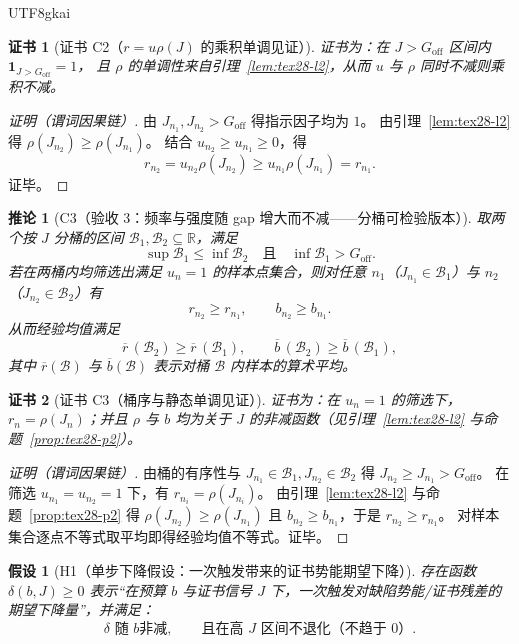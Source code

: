 \documentclass[12pt]{article}
\newtheorem{assumption}{假设}[section]
\newtheorem{corollary}{推论}[section]
\newtheorem{Certificate}{证书}[section]
\newcommand{\RR}{\mathbb{R}}
\newcommand{\indicator}[1]{\mathbf{1}_{#1}}
\begin{document}
\begin{CJK*}{UTF8}{gkai}
\begin{Certificate}[证书 C2（$r=u\rho(J)$ 的乘积单调见证）]
\label{cert:tex28-c2}
证书为：在 $J>G_{\mathrm{off}}$ 区间内 $\indicator{J>G_{\mathrm{off}}}=1$，
且 $\rho$ 的单调性来自引理~\ref{lem:tex28-l2}，从而 $u$ 与 $\rho$ 同时不减则乘积不减。
\end{Certificate}

\begin{proof}[证明（谓词因果链）]
由 $J_{n_1},J_{n_2}>G_{\mathrm{off}}$ 得指示因子均为 $1$。
由引理~\ref{lem:tex28-l2} 得 $\rho(J_{n_2})\ge \rho(J_{n_1})$。
结合 $u_{n_2}\ge u_{n_1}\ge 0$，得
\[
  r_{n_2}=u_{n_2}\rho(J_{n_2})
  \ge u_{n_1}\rho(J_{n_1})=r_{n_1}.
\]
证毕。
\end{proof}

\begin{corollary}[C3（验收 3：频率与强度随 gap 增大而不减——分桶可检验版本）]
\label{cor:tex28-c3}
取两个按 $J$ 分桶的区间 $\mathcal{B}_1,\mathcal{B}_2\subseteq\RR$，满足
\[
  \sup\mathcal{B}_1 \le \inf\mathcal{B}_2
  \quad\text{且}\quad
  \inf\mathcal{B}_1>G_{\mathrm{off}}.
\]
若在两桶内均筛选出满足 $u_n=1$ 的样本点集合，则对任意
$n_1$（$J_{n_1}\in\mathcal{B}_1$）与 $n_2$（$J_{n_2}\in\mathcal{B}_2$）有
\[
  r_{n_2}\ge r_{n_1},\qquad b_{n_2}\ge b_{n_1}.
\]
从而经验均值满足
\[
  \overline{r}\,(\mathcal{B}_2)\ge \overline{r}\,(\mathcal{B}_1),
  \qquad
  \overline{b}\,(\mathcal{B}_2)\ge \overline{b}\,(\mathcal{B}_1),
\]
其中 $\overline{r}(\mathcal{B})$ 与 $\overline{b}(\mathcal{B})$ 表示对桶 $\mathcal{B}$ 内样本的算术平均。
\end{corollary}

\begin{Certificate}[证书 C3（桶序与静态单调见证）]
\label{cert:tex28-c3}
证书为：在 $u_n=1$ 的筛选下，$r_n=\rho(J_n)$；并且 $\rho$ 与 $b$ 均为关于 $J$ 的非减函数（见引理~\ref{lem:tex28-l2} 与命题~\ref{prop:tex28-p2}）。
\end{Certificate}

\begin{proof}[证明（谓词因果链）]
由桶的有序性与 $J_{n_1}\in\mathcal{B}_1,J_{n_2}\in\mathcal{B}_2$ 得 $J_{n_2}\ge J_{n_1}>G_{\mathrm{off}}$。
在筛选 $u_{n_1}=u_{n_2}=1$ 下，有 $r_{n_i}=\rho(J_{n_i})$。
由引理~\ref{lem:tex28-l2} 与命题~\ref{prop:tex28-p2} 得 $\rho(J_{n_2})\ge \rho(J_{n_1})$ 且 $b_{n_2}\ge b_{n_1}$，于是 $r_{n_2}\ge
  r_{n_1}$。
对样本集合逐点不等式取平均即得经验均值不等式。证毕。
\end{proof}

\begin{assumption}[H1（单步下降假设：一次触发带来的证书势能期望下降）]
\label{assu:tex28-h1}
存在函数 $\delta(b,J)\ge 0$ 表示“在预算 $b$ 与证书信号 $J$ 下，一次触发对缺陷势能/证书残差的期望下降量”，并满足：
\[
  \delta \text{ 随 } b \text{非减},\qquad
  \text{且在高 }J\text{ 区间不退化（不趋于 }0\text{）}.
\]
\end{assumption}


\end{CJK*}
\end{document}
